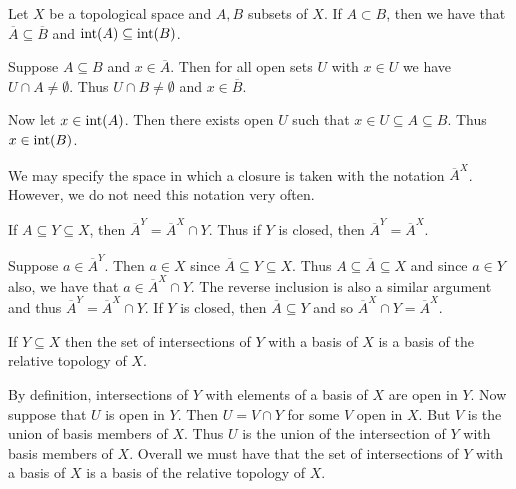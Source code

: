 \documentclass[letterpaper, 11pt, oneside]{book}
\begin{document}
\clearpage

\begin{prop}
  Let $X$ be a topological space and $A, B$ subsets of $X$.
  If $A \subset B$, then we have that $\overline{A} \subseteq \overline{B}$ and $\operatorname{int}(A) \subseteq \operatorname{int}(B)$.
\end{prop}
\begin{pf}
  Suppose $A \subseteq B$ and $x \in \overline{A}$.
  Then for all open sets $U$ with $x \in U$ we have $U \cap A \neq \emptyset$.
  Thus $U \cap B \neq \emptyset$ and $x \in \overline{B}$.

  Now let $x \in \operatorname{int}(A)$.
  Then there exists open $U$ such that $x \in U \subseteq A \subseteq B$.
  Thus $x \in \operatorname{int}(B)$.
\end{pf}

We may specify the space in which a closure is taken with the notation $\overline{A}^{X}$.
However, we do not need this notation very often.

\begin{prop}
  If $A \subseteq Y \subseteq X$, then $\overline{A}^{Y} = \overline{A}^{X} \cap Y$.
  Thus if $Y$ is closed, then $\overline{A}^{Y} = \overline{A}^{X}$.
\end{prop}
\begin{pf}
  Suppose $a \in \overline{A}^{Y}$.
  Then $a \in X$ since $\overline{A} \subseteq Y \subseteq X$.
  Thus $A \subseteq \overline{A} \subseteq X$ and since $a \in Y$ also, we have that $a \in \overline{A}^{X} \cap Y$.
  The reverse inclusion is also a similar argument and thus $\overline{A}^{Y} = \overline{A}^{X} \cap Y$.
  If $Y$ is closed, then $\overline{A} \subseteq Y$ and so $\overline{A}^{X} \cap Y = \overline{A}^{X}$.
\end{pf}

\begin{prop}
  If $Y \subseteq X$ then the set of intersections of $Y$ with a basis of $X$ is a basis of the relative topology of $X$.
\end{prop}
\begin{pf}
  By definition, intersections of $Y$ with elements of a basis of $X$ are open in $Y$.
  Now suppose that $U$ is open in $Y$.
  Then $U = V \cap Y$ for some $V$ open in $X$.
  But $V$ is the union of basis members of $X$.
  Thus $U$ is the union of the intersection of $Y$ with basis members of $X$.
  Overall we must have that the set of intersections of $Y$ with a basis of $X$ is a basis of the relative topology of $X$.
\end{pf}
\end{document}
